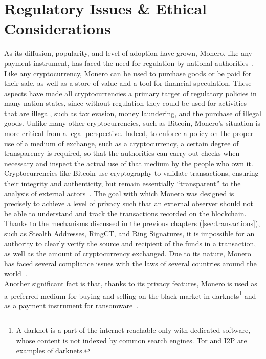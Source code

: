 \documentclass[conference]{IEEEtran}
\begin{document}

\section{Regulatory Issues \& Ethical Considerations}
As its diffusion, popularity, and level of adoption have grown, Monero, like any payment instrument, has faced the need for regulation by national authorities~\cite{monero_illegal}. Like any cryptocurrency, Monero can be used to purchase goods or be paid for their sale, as well as a store of value and a tool for financial speculation. These aspects have made all cryptocurrencies a primary target of regulatory policies in many nation states, since without regulation they could be used for activities that are illegal, such as tax evasion, money laundering, and the purchase of illegal goods. Unlike many other cryptocurrencies, such as Bitcoin, Monero's situation is more critical from a legal perspective. Indeed, to enforce a policy on the proper use of a medium of exchange, such as a cryptocurrency, a certain degree of transparency is required, so that the authorities can carry out checks when necessary and inspect the actual use of that medium by the people who own it. Cryptocurrencies like Bitcoin use cryptography to validate transactions, ensuring their integrity and authenticity, but remain essentially ``transparent'' to the analysis of external actors~\cite{bitcoin_auditable}. The goal with which Monero was designed is precisely to achieve a level of privacy such that an external observer should not be able to understand and track the transactions recorded on the blockchain. Thanks to the mechanisms discussed in the previous chapters (\autoref{sec:transactions}), such as Stealth Addresses, RingCT, and Ring Signatures, it is impossible for an authority to clearly verify the source and recipient of the funds in a transaction, as well as the amount of cryptocurrency exchanged. Due to its nature, Monero has faced several compliance issues with the laws of several countries around the world~\cite{monero_illegal}.\\
Another significant fact is that, thanks to its privacy features, Monero is used as a preferred medium for buying and selling on the black market in darknets\footnote{A darknet is a part of the internet reachable only with dedicated software, whose content is not indexed by common search engines. Tor and I2P are examples of darknets.} and as a payment instrument for ransomware~\cite{monero_illegal_usage, crypto_money_laundering}.\\
\end{document}
